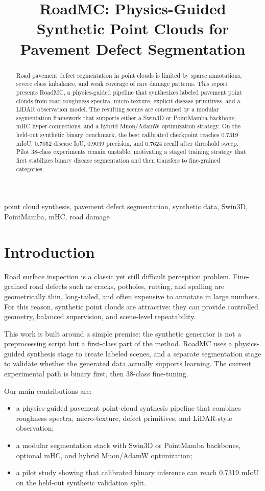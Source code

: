 \documentclass[conference]{IEEEtran}
\title{RoadMC: Physics-Guided Synthetic Point Clouds for Pavement Defect Segmentation}
\author{\IEEEauthorblockN{YQGHL}
\IEEEauthorblockA{RoadMC repository snapshot\\
\texttt{https://github.com/YQGHL/roadmc}}}
\begin{document}
\maketitle

\begin{abstract}
Road pavement defect segmentation in point clouds is limited by sparse annotations, severe class imbalance, and weak coverage of rare damage patterns. This report presents RoadMC, a physics-guided pipeline that synthesizes labeled pavement point clouds from road roughness spectra, micro-texture, explicit disease primitives, and a LiDAR observation model. The resulting scenes are consumed by a modular segmentation framework that supports either a Swin3D or PointMamba backbone, mHC hyper-connections, and a hybrid Muon/AdamW optimization strategy. On the held-out synthetic binary benchmark, the best calibrated checkpoint reaches 0.7319 mIoU, 0.7052 disease IoU, 0.9039 precision, and 0.7624 recall after threshold sweep. Pilot 38-class experiments remain unstable, motivating a staged training strategy that first stabilizes binary disease segmentation and then transfers to fine-grained categories.
\end{abstract}

\begin{IEEEkeywords}
point cloud synthesis, pavement defect segmentation, synthetic data, Swin3D, PointMamba, mHC, road damage
\end{IEEEkeywords}

\section{Introduction}
Road surface inspection is a classic yet still difficult perception problem. Fine-grained road defects such as cracks, potholes, rutting, and spalling are geometrically thin, long-tailed, and often expensive to annotate in large numbers. For this reason, synthetic point clouds are attractive: they can provide controlled geometry, balanced supervision, and scene-level repeatability.

This work is built around a simple premise: the synthetic generator is not a preprocessing script but a first-class part of the method. RoadMC uses a physics-guided synthesis stage to create labeled scenes, and a separate segmentation stage to validate whether the generated data actually supports learning. The current experimental path is binary first, then 38-class fine-tuning.

Our main contributions are:
\begin{itemize}
  \item a physics-guided pavement point-cloud synthesis pipeline that combines roughness spectra, micro-texture, defect primitives, and LiDAR-style observation;
  \item a modular segmentation stack with Swin3D or PointMamba backbones, optional mHC, and hybrid Muon/AdamW optimization;
  \item a pilot study showing that calibrated binary inference can reach 0.7319 mIoU on the held-out synthetic validation split.
\end{itemize}
\end{document}
